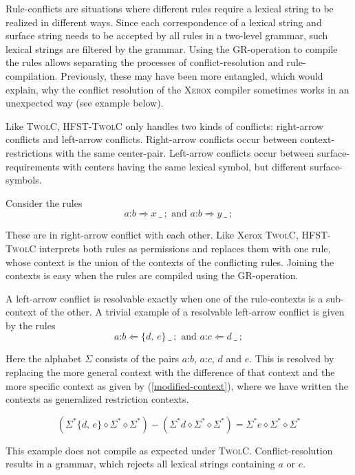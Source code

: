 \documentclass[postprint]{flammie}
\begin{document}
Rule-conflicts are situations where different rules require a lexical
string to be realized in different ways. Since each correspondence of
a lexical string and surface string needs to be accepted by all rules
in a two-level grammar, such lexical strings are filtered by the
grammar. Using the GR-operation to compile the rules allows separating
the processes of conflict-resolution and rule-compilation. Previously,
these may have been more entangled, which would explain, why the
conflict resolution of the \textsc{Xerox} compiler sometimes works in
an unexpected way (see example below).

Like \textsc{TwolC}, \textsc{HFST-TwolC} only handles two kinds of
conflicts: right-arrow conflicts and left-arrow conflicts. Right-arrow
conflicts occur between context-restrictions with the same
center-pair. Left-arrow conflicts occur between surface-requirements
with centers having the same lexical symbol, but different
surface-symbols.

Consider the rules
$$a\text{:}b \Rightarrow x \ \_\ ;\text{ and }a\text{:}b \Rightarrow
y\ \_\ ;$$

These are in right-arrow conflict with each other. Like Xerox
\textsc{TwolC}, \textsc{HFST-TwolC} interprets both rules as
permissions and replaces them with one rule, whose context is the
union of the contexts of the conflicting rules. Joining the contexts
is easy when the rules are compiled using the GR-operation.

A left-arrow conflict is resolvable exactly when one of the
rule-contexts is a sub-context of the other. A trivial example of a
resolvable left-arrow conflict is given by the rules
$$a\text{:}b \Leftarrow \{d\text{, }e\}\ \_\ ;\text{ and }a\text{:}c
\Leftarrow d\ \_\ ;$$ 

Here the alphabet $\Sigma$ consists of the pairs $a\text{:}b$,
$a\text{:}c$, $d$ and $e$. This is resolved by replacing the more
general context with the difference of that context and the more
specific context as given by (\ref{modified-context}), where we have
written the contexts as generalized restriction contexts.

\begin{equation}
  \label{modified-context}
  (\Sigma^* \{d\text{, }e\}\diamond \Sigma^* \diamond \Sigma^*) -
  (\Sigma^* d \diamond \Sigma^* \diamond \Sigma^*) = \Sigma^*
  e\diamond \Sigma^* \diamond \Sigma^*
\end{equation}

This example does not compile as expected under
\textsc{TwolC}. Conflict-resolution results in a grammar, which
rejects all lexical strings containing $a$ or $e$.
\end{document}
